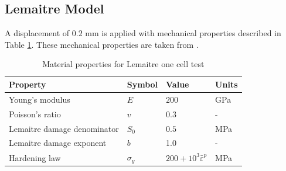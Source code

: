 \documentclass[sn-mathphys,Numbered]{sn-jnl}%
\begin{document}
\begin{appendices}
\subsection{Lemaitre Model}
A displacement of $0.2$ mm is applied with mechanical properties described in Table \ref{tab:material_properties_one_elem_lemaitre}.
These mechanical properties are taken from \citet{autay_numerical_2018}.
\begin{table}[htb]
	\centering
		\begin{tabular}{llll} \hline
			Property & Symbol & Value & Units  \\ \hline 
			Young's modulus & $E$ & $200$ & GPa \\
			Poisson's ratio & $v$ & $0.3$ & -  \\
			Lemaitre damage denominator & $S_0$ & $0.5$ &  MPa  \\
			Lemaitre damage exponent & $b$ & 1.0 & - \\
			Hardening law & $\sigma_y$ & $200+10^3{\bar{\varepsilon}}^p$ &  MPa  \\
			\hline
		\end{tabular}
	\caption{Material properties for Lemaitre one cell test}
	\label{tab:material_properties_one_elem_lemaitre}
\end{table}


\end{appendices}
\end{document}
